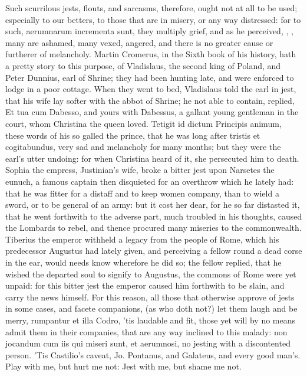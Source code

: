 {Such scurrilous jests, flouts, and sarcasms, therefore, ought not at
all to be used; especially to our betters, to those that are in misery,
or any way distressed: for to such, aerumnarum incrementa sunt, they
multiply grief, and as he perceived, , \etc{}, many are ashamed, many vexed, angered, and there is no
greater cause or furtherer of melancholy. Martin Cromerus, in the Sixth
book of his history, hath a pretty story to this purpose, of
Vladislaus, the second king of Poland, and Peter Dunnius, earl of
Shrine; they had been hunting late, and were enforced to lodge in a
poor cottage. When they went to bed, Vladislaus told the earl in jest,
that his wife lay softer with the abbot of Shrine; he not able to
contain, replied, Et tua cum Dabesso, and yours with Dabessus, a
gallant young gentleman in the court, whom Christina the queen loved.
Tetigit id dictum Principis animum, these words of his so galled the
prince, that he was long after tristis et cogitabundus, very sad and
melancholy for many months; but they were the earl's utter undoing: for
when Christina heard of it, she persecuted him to death. Sophia the
empress, Justinian's wife, broke a bitter jest upon Narsetes the
eunuch, a famous captain then disquieted for an overthrow which he
lately had: that he was fitter for a distaff and to keep women company,
than to wield a sword, or to be general of an army: but it cost her
dear, for he so far distasted it, that he went forthwith to the adverse
part, much troubled in his thoughts, caused the Lombards to rebel, and
thence procured many miseries to the commonwealth. Tiberius the emperor
withheld a legacy from the people of Rome, which his predecessor
Augustus had lately given, and perceiving a fellow round a dead corse
in the ear, would needs know wherefore he did so; the fellow replied,
that he wished the departed soul to signify to Augustus, the commons of
Rome were yet unpaid: for this bitter jest the emperor caused him
forthwith to be slain, and carry the news himself. For this reason, all
those that otherwise approve of jests in some cases, and facete
companions, (as who doth not?) let them laugh and be merry, rumpantur
et illa Codro, 'tis laudable and fit, those yet will by no means admit
them in their companies, that are any way inclined to this malady: non
jocandum cum iis qui miseri sunt, et aerumnosi, no jesting with a
discontented person. 'Tis Castilio's caveat, Jo. Pontanus, and
Galateus, and every good man's.
Play with me, but hurt me not:
Jest with me, but shame me not.

}
